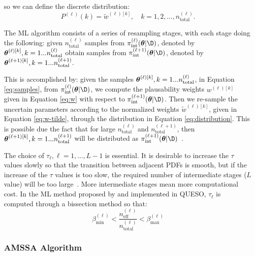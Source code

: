 so we can define the discrete distribution:
\begin{equation}
 \label{eq:distribution}
 P^{(\ell)}(k) = \tilde{w}^{(\ell) [k]} , \quad k=1,2,\ldots, n_\text{total}^{(\ell)}.
\end{equation}


The ML algorithm consists of a series of resampling stages, with each stage doing the following: given $n_\text{total}^{(\ell)}$ samples from $\pi_\text{int}^{(\ell)} (\bv{\theta}|\D)$, denoted by $\mbox{\boldmath$ \theta $}^{(\ell)[k]}, k=1...n_\text{total}^{(\ell)}$ obtain samples from $\pi_\text{int}^{(\ell+1)} (\bv{\theta}|\D)$, denoted by
$\mbox{\boldmath$ \theta $}^{(\ell+1)[k]}, k=1...n_\text{total}^{(\ell+1)}$. 

This is accomplished by: given the samples  $\mbox{\boldmath$ \theta $}^{(\ell)[k]}, k=1...n_\text{total}^{(\ell)}$, in Equation \eqref{eq:samples}, from $\pi_\text{int}^{(\ell)} (\bv{\theta}|\D)$, we compute the plausability weights $w^{(\ell) [k]}$ given in Equation \eqref{eq:w} with respect to $\pi_\text{int}^{(\ell+1)} (\bv{\theta}|\D)$. Then we re-sample the uncertain parameters according to the normalized weights $\tilde{w}^{(\ell) [k]}$, given in Equation \eqref{eq:w-tilde}, through the distribution in Equation \eqref{eq:distribution}. This is possible due the fact that for large $n_\text{total}^{(\ell)}$ and $n_\text{total}^{(\ell+1)}$, then   $\mbox{\boldmath$ \theta $}^{(\ell+1)[k]}, k=1...n_\text{total}^{(\ell+1)}$ will be distributed as $\pi_\text{int}^{(\ell+1)} (\bv{\theta}|\D)$~\cite{ChingChen2007}.

The choice of $\tau_\ell, \ell=1,\ldots,L-1$ is essential. It is desirable to increase the $\tau$ values slowly so that the transition between adjacent PDFs is smooth, but if the increase of the $\tau$ values is too slow, the required number of intermediate stages ($L$ value) will be too large~\cite{ChingChen2007}. More intermediate stages mean more computational cost.  In the ML method proposed by \cite{CheungPrudencio2012} and implemented in QUESO, $\tau_\ell$ is computed through a bissection method so that:
\begin{equation}\label{eq:tau}
\beta_\text{min}^{(\ell)}<\dfrac{n_\text{eff}^{(\ell)}}{n_\text{total}^{(\ell)}} <\beta_\text{max}^{(\ell)}
\end{equation}


\subsubsection{AMSSA Algorithm}

